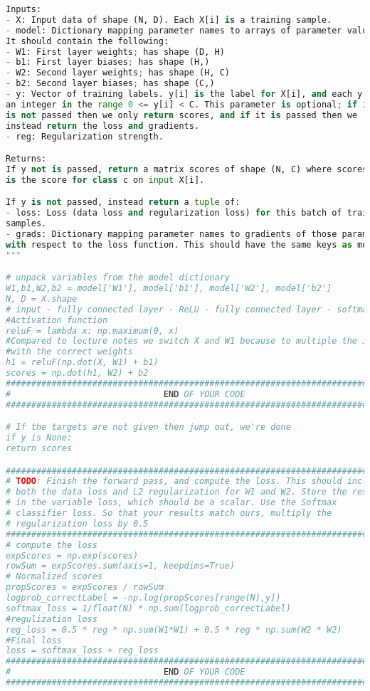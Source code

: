 \begin{lstlisting}[language=Python, label=lst:neuralnet.py, caption={neural\_net.py}, basicstyle=\tiny]
Inputs:
- X: Input data of shape (N, D). Each X[i] is a training sample.
- model: Dictionary mapping parameter names to arrays of parameter values.
It should contain the following:
- W1: First layer weights; has shape (D, H)
- b1: First layer biases; has shape (H,)
- W2: Second layer weights; has shape (H, C)
- b2: Second layer biases; has shape (C,)
- y: Vector of training labels. y[i] is the label for X[i], and each y[i] is
an integer in the range 0 <= y[i] < C. This parameter is optional; if it
is not passed then we only return scores, and if it is passed then we
instead return the loss and gradients.
- reg: Regularization strength.

Returns:
If y not is passed, return a matrix scores of shape (N, C) where scores[i, c]
is the score for class c on input X[i].

If y is not passed, instead return a tuple of:
- loss: Loss (data loss and regularization loss) for this batch of training
samples.
- grads: Dictionary mapping parameter names to gradients of those parameters
with respect to the loss function. This should have the same keys as model.
"""

# unpack variables from the model dictionary
W1,b1,W2,b2 = model['W1'], model['b1'], model['W2'], model['b2']
N, D = X.shape  
# input - fully connected layer - ReLU - fully connected layer - softmax
#Activation function
reluF = lambda x: np.maximum(0, x)
#Compared to lecture notes we switch X and W1 because to multiple the inputs 
#with the correct weights
h1 = reluF(np.dot(X, W1) + b1)
scores = np.dot(h1, W2) + b2
#############################################################################
#                              END OF YOUR CODE                             #
#############################################################################

# If the targets are not given then jump out, we're done
if y is None:
return scores

#############################################################################
# TODO: Finish the forward pass, and compute the loss. This should include  #
# both the data loss and L2 regularization for W1 and W2. Store the result  #
# in the variable loss, which should be a scalar. Use the Softmax           #
# classifier loss. So that your results match ours, multiply the            #
# regularization loss by 0.5                                                #
#############################################################################
# compute the loss
expScores = np.exp(scores)
rowSum = expScores.sum(axis=1, keepdims=True)
# Normalized scores
propScores = expScores / rowSum
logprob_correctLabel = -np.log(propScores[range(N),y])
softmax_loss = 1/float(N) * np.sum(logprob_correctLabel)
#regulization loss
reg_loss = 0.5 * reg * np.sum(W1*W1) + 0.5 * reg * np.sum(W2 * W2)
#Final loss 
loss = softmax_loss + reg_loss
#############################################################################
#                              END OF YOUR CODE                             #
#############################################################################


\end{lstlisting}
